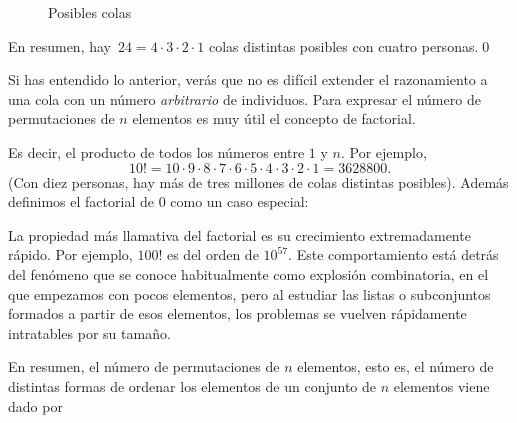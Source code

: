 \begin{Ejemplo}
\begin{itemize}
\begin{center}
\begin{figure}[h!]
            \caption{Posibles colas}\label{cap03:fig:arbol4}
            \end{figure}
            \end{center}
    \end{itemize}
    En resumen, hay\, $24=4\cdot 3\cdot 2\cdot 1$ colas distintas posibles con cuatro personas.\qed
    \end{Ejemplo}
Si has entendido lo anterior, verás que no es dif\'icil extender el razonamiento a una cola con un n\'umero {\em arbitrario} de individuos. Para expresar el número de permutaciones de $n$ elementos es muy \'util el concepto de {\sf factorial}.
    \begin{center}
    \end{center}
Es decir, el producto de todos los números entre $1$ y $n$. Por ejemplo,
\[10!=10\cdot 9\cdot 8\cdot 7\cdot 6\cdot 5\cdot 4\cdot 3\cdot 2\cdot 1=3628800.\]
(Con diez personas, hay más de tres millones de colas distintas posibles). Además definimos el factorial de $0$ como un caso especial:
    \begin{center}
    \end{center}
La propiedad más llamativa del factorial es su crecimiento extremadamente rápido. Por ejemplo, $100!$ es del orden de $10^{57}$. Este comportamiento
está detrás del fenómeno que se conoce habitualmente como {\sf explosión combinatoria}, en el que empezamos con pocos
elementos, pero al estudiar las listas o subconjuntos formados a partir de esos elementos, los problemas se vuelven rápidamente intratables por su tamaño.

En resumen, el número de permutaciones de $n$ elementos, esto es, el n\'umero de {\sf distintas formas de ordenar} los elementos de un conjunto de $n$ elementos viene dado por
    \begin{center}
    \end{center}


